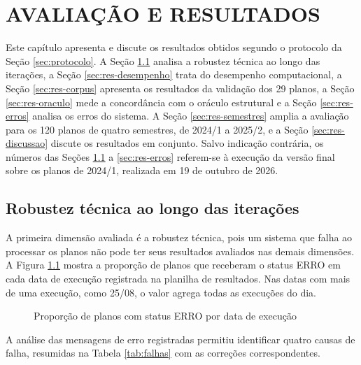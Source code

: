 \chapter{AVALIAÇÃO E RESULTADOS}
\label{cap:resultados}

Este capítulo apresenta e discute os resultados obtidos segundo o protocolo da Seção \ref{sec:protocolo}. A Seção \ref{sec:res-robustez} analisa a robustez técnica ao longo das iterações, a Seção \ref{sec:res-desempenho} trata do desempenho computacional, a Seção \ref{sec:res-corpus} apresenta os resultados da validação dos 29 planos, a Seção \ref{sec:res-oraculo} mede a concordância com o oráculo estrutural e a Seção \ref{sec:res-erros} analisa os erros do sistema. A Seção \ref{sec:res-semestres} amplia a avaliação para os 120 planos de quatro semestres, de 2024/1 a 2025/2, e a Seção \ref{sec:res-discussao} discute os resultados em conjunto. Salvo indicação contrária, os números das Seções \ref{sec:res-robustez} a \ref{sec:res-erros} referem-se à execução da versão final sobre os planos de 2024/1, realizada em 19 de outubro de 2026.

\section{Robustez técnica ao longo das iterações}
\label{sec:res-robustez}

A primeira dimensão avaliada é a robustez técnica, pois um sistema que falha ao processar os planos não pode ter seus resultados avaliados nas demais dimensões. A Figura \ref{fig:evolucao} mostra a proporção de planos que receberam o status ERRO em cada data de execução registrada na planilha de resultados. Nas datas com mais de uma execução, como 25/08, o valor agrega todas as execuções do dia.

\begin{figure}[htbp]
\centering
\caption{Proporção de planos com status ERRO por data de execução}
\label{fig:evolucao}

\end{figure}

A análise das mensagens de erro registradas permitiu identificar quatro causas de falha, resumidas na Tabela \ref{tab:falhas} com as correções correspondentes.

